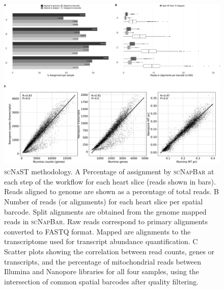 \documentclass[utf8]{frontiers_suppmat} %
\newcommand{\scn}{\textsc{scNapBar}\xspace}
\newcommand{\scnast}{\textsc{scNaST}\xspace}
\begin{document}
\begin{figure}[htbp]
\begin{center}
\includegraphics[width=\textwidth]{figS1}%
\end{center}
\caption{\scnast methodology. A Percentage of assignment by \scn at each step of the workflow for each heart slice (reads shown in bars). Reads aligned to genome are shown as a percentage of total reads. B Number of reads (or alignments) for each heart slice per spatial barcode. Split alignments are obtained from the genome mapped reads in \scn. Raw reads correspond to primary alignments converted to FASTQ format. Mapped are alignments to the transcriptome used for transcript abundance quantification. C Scatter plots showing the correlation between read counts, genes or transcripts, and the percentage of mitochondrial reads between Illumina and Nanopore libraries for all four samples, using the intersection of common spatial barcodes after quality filtering.}\label{fig:S1}
\end{figure}
\end{document}
